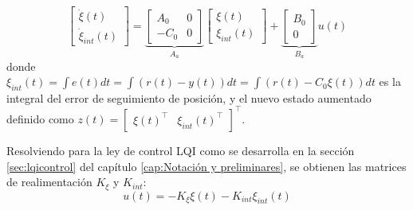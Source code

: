 \begin{equation} 
    \begin{bmatrix}
        \dot{\xi}(t) \\ \dot{\xi}_{int}(t)
    \end{bmatrix} = \underbrace{\begin{bmatrix}
        A_0 & 0 \\ -C_0 & 0 
    \end{bmatrix}}_{A_a} \begin{bmatrix}
        \xi(t) \\ \xi_{int}(t)
    \end{bmatrix} + \underbrace{\begin{bmatrix}
        B_0 \\ 0
    \end{bmatrix}}_{B_a} u(t)
\end{equation}
donde $\xi_{int}(t) = \int e(t) dt= \int (r(t)-y(t)) dt = \int (r(t)-C_0 \xi(t)) dt$ es la integral del error de seguimiento de posición, y el nuevo estado aumentado definido como $z(t) = \begin{bmatrix} \xi(t)^\top & \xi_{int}(t)^\top\end{bmatrix}^\top$.

Resolviendo para la ley de control LQI como se desarrolla en la sección \ref{sec:lqicontrol} del capítulo \ref{cap:Notación y preliminares}, se obtienen las matrices de realimentación $K_\xi$ y $K_{int}$:
\begin{equation}
    u(t) = -K_\xi \xi(t) - K_{int} \xi_{int}(t)
\end{equation}

